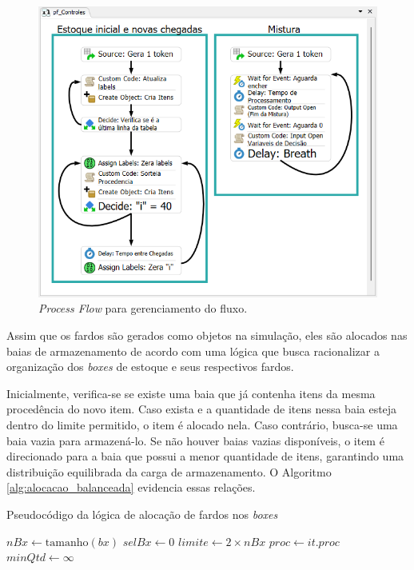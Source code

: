 \documentclass[
    12pt,                %
    openright,           %
    oneside,             %
    a4paper,             %
    english,             %
    spanish,             %
    brazil               %
]{ufscar}
\begin{document}
\begin{figure}[hbt]
\centering
  \caption{\textit{Process Flow} para gerenciamento do fluxo.}
  \label{figure:ProcessFlow}
  \includegraphics[width=1\textwidth]{figures/ProcessFlow.png}
\end{figure}

Assim que os fardos são gerados como objetos na simulação, eles são alocados nas baias de armazenamento de acordo com uma lógica que busca racionalizar a organização dos \textit{boxes} de estoque e seus respectivos fardos. 

Inicialmente, verifica-se se existe uma baia que já contenha itens da mesma procedência do novo item. Caso exista e a quantidade de itens nessa baia esteja dentro do limite permitido, o item é alocado nela. Caso contrário, busca-se uma baia vazia para armazená-lo. Se não houver baias vazias disponíveis, o item é direcionado para a baia que possui a menor quantidade de itens, garantindo uma distribuição equilibrada da carga de armazenamento. O Algoritmo \ref{alg:alocacao_balanceada} evidencia essas relações.

\begin{algorithm}[H]
\caption{Pseudocódigo da lógica de alocação de fardos nos \textit{boxes}}
\label{alg:alocacao_balanceada}

\(nBx \gets \text{tamanho}(bx)\)\;
\(selBx \gets 0\)\;
\(limite \gets 2 \times nBx\)\;
\(proc \gets it.proc\)\;
\(minQtd \gets \infty\)\;


\end{algorithm}
\end{document}
